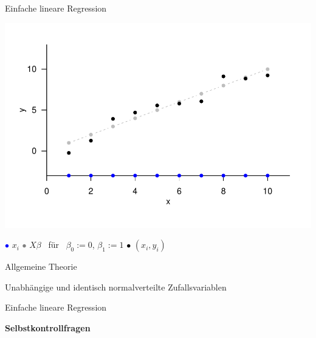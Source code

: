 \documentclass[
  8pt,
  ignorenonframetext,
]{beamer}
\begin{document}
\begin{frame}{Einfache lineare Regression}
\protect\hypertarget{einfache-lineare-regression-2}{}
\footnotesize

\vspace{4mm}

\begin{center}\includegraphics[width=0.85\linewidth]{5_Abbildungen/alm_5_elr} \end{center}
\vspace{-4mm}
\small
\center

\textcolor{blue}{$\bullet$} \(x_i\) \hspace{2mm}
\textcolor{grey}{$\bullet$} \(X\beta\) \mbox{ für } \(\beta_0 := 0\),
\(\beta_1 := 1\) \hspace{2mm} \hspace{2mm} \textcolor{black}{$\bullet$}
\((x_i,y_i)\)
\end{frame}

\begin{frame}{}
\protect\hypertarget{section-6}{}
\large
{}
\vfill

Allgemeine Theorie

Unabhängige und identisch normalverteilte Zufallsvariablen

Einfache lineare Regression

\textbf{Selbstkontrollfragen} \vfill
\end{frame}
\end{document}
